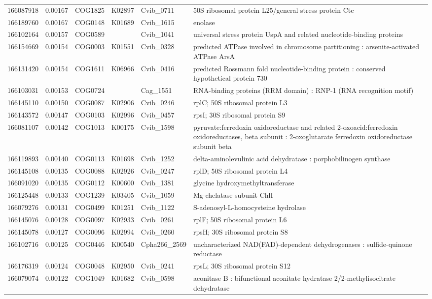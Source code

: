\begin{landscape}
\begin{longtable}{p{1.8cm}p{0.9cm}p{2.2cm}p{1cm}p{2.8cm}p{13.4cm}}
166087918&0.00167&COG1825&K02897&Cvib\_0711&50S ribosomal protein L25/general stress protein Ctc \\
166189760&0.00167&COG0148&K01689&Cvib\_1615&enolase \\
166102164&0.00157&COG0589&&Cvib\_1041&universal stress protein UspA and related nucleotide-binding proteins \\
166154669&0.00154&COG0003&K01551&Cvib\_0328&predicted ATPase involved in chromosome partitioning : arsenite-activated ATPase ArsA \\
166131420&0.00154&COG1611&K06966&Cvib\_0416&predicted Rossmann fold nucleotide-binding protein : conserved hypothetical protein 730 \\
166103031&0.00153&COG0724&&Cag\_1551&RNA-binding proteins (RRM domain) : RNP-1 (RNA recognition motif) \\
166145110&0.00150&COG0087&K02906&Cvib\_0246&rplC; 50S ribosomal protein L3 \\
166143572&0.00147&COG0103&K02996&Cvib\_0457&rpsI; 30S ribosomal protein S9 \\
166081107&0.00142&COG1013&K00175&Cvib\_1598&pyruvate:ferredoxin oxidoreductase and related 2-oxoacid:ferredoxin oxidoreductases, beta subunit : 2-oxoglutarate ferredoxin oxidoreductase subunit beta \\
166119893&0.00140&COG0113&K01698&Cvib\_1252&delta-aminolevulinic acid dehydratase : porphobilinogen synthase \\
166145108&0.00135&COG0088&K02926&Cvib\_0247&rplD; 50S ribosomal protein L4 \\
166091020&0.00135&COG0112&K00600&Cvib\_1381&glycine hydroxymethyltransferase \\
166125448&0.00133&COG1239&K03405&Cvib\_1059&Mg-chelatase subunit ChlI \\
166079276&0.00131&COG0499&K01251&Cvib\_1122&S-adenosyl-L-homocysteine hydrolase \\
166145076&0.00128&COG0097&K02933&Cvib\_0261&rplF; 50S ribosomal protein L6 \\
166145078&0.00127&COG0096&K02994&Cvib\_0260&rpsH; 30S ribosomal protein S8 \\
166102716&0.00125&COG0446&K00540&Cpha266\_2569&uncharacterized NAD(FAD)-dependent dehydrogenases : sulfide-quinone reductase \\
166176319&0.00124&COG0048&K02950&Cvib\_0241&rpsL; 30S ribosomal protein S12 \\
166079074&0.00122&COG1049&K01682&Cvib\_0598&aconitase B : bifunctional aconitate hydratase 2/2-methylisocitrate dehydratase \\

\end{longtable}
\end{landscape}
